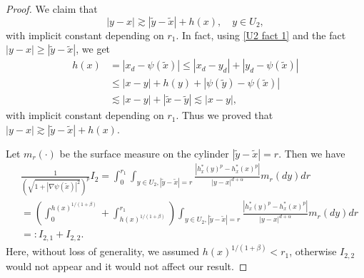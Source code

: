 \documentclass[12pt,a4paper]{amsart}
\numberwithin{equation}{section}
\theoremstyle{plain}
\newcommand{\wt}{\widetilde}
\newcommand{\1}{\mathbbm{1}}
\begin{document}
\begin{proof}
We claim that 
\begin{equation}\label{U2 fact 2}
|y-x| \gtrsim |\wt y - \wt x| + h(x), \quad y \in U_2,
\end{equation}
with implicit constant depending on $r_1$. In fact, 
using \eqref{U2 fact 1} and the fact $|y-x| \ge |\wt y - \wt x|$, we get
\begin{align*}
h(x) & = |x_d -\psi(\wt x)| \le |x_d - y_d| + |y_d -\psi(\wt x)| \\
& \le |x-y| + h(y) + |\psi(\wt y) -\psi(\wt x)| \\
& \lesssim |x - y| + |\wt x - \wt y| \lesssim |x-y|,
\end{align*}
with implicit constant depending on $r_1$. Thus we proved that $|y-x| \gtrsim |\wt y - \wt x| + h(x)$. 

Let $m_r(\cdot)$ be the surface measure on the cylinder $|\wt y-\wt x|=r$. Then we have
\begin{align*}
&\frac{1}{(\sqrt{1 + |\nabla \psi(\wt x)|^2})^p}  I_2  = \int_0^{r_1} \int_{y \in U_2, |\wt y - \wt x| = r} \frac{|h_x^*(y)^p - h_x^*(x)^p|}{|y-x|^{d+\alpha}}
m_r(dy)dr \\
& = \left(\int_0^{h(x)^{1/(1+\beta)}} + \int_{h(x)^{1/(1+\beta)}}^{r_1}\right)\int_{y \in U_2, |\wt y - \wt x| = r} \frac{|h_x^*(y)^p - h_x^*(x)^p|}{|y-x|^{d+\alpha}}m_r(dy)dr \\
& =: I_{2,1} + I_{2,2}.
\end{align*}
Here, without loss of generality, we assumed $h(x)^{1/(1+\beta)} < r_1$, otherwise $I_{2,2}$ would not appear and it would not affect our result. 


\end{proof}
\end{document}
